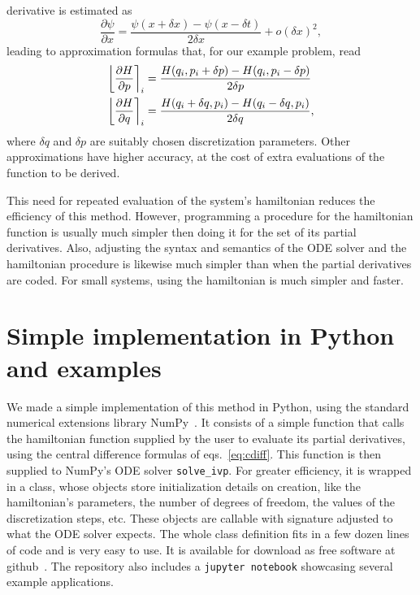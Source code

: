 \documentclass{iopart}
\newcommand{\numap}[1]{\ensuremath{%
    \left\lfloor#1\right\rceil
}}
\begin{document}
derivative is estimated as
\begin{equation}\label{eq:cdiff}
  \frac{\partial\psi}{\partial x} = 
    \frac{\psi(x+\delta x)-\psi(x-\delta t)}{2\delta x}+
  o(\delta x)^2,
\end{equation}
leading to approximation formulas that, for our example problem, read 
\begin{align}
  \numap{\frac{\partial H}{\partial p}}_i &=
  \frac{H(q_i, p_i+\delta p)-H(q_i, p_i-\delta p)}{2\delta p}\\
  \numap{\frac{\partial H}{\partial q}}_i &=
  \frac{H(q_i+\delta q, p_i)-H(q_i-\delta q, p_i)}{2\delta q},
\end{align}
where $\delta q$ and $\delta p$ are suitably chosen discretization parameters.
Other approximations have higher accuracy, at the cost of extra evaluations of
the function to be derived.

This need for repeated evaluation of the system's hamiltonian reduces the
efficiency of this method. However, programming a procedure for the hamiltonian
function is usually much simpler then doing it for the set of its partial
derivatives.  Also, adjusting the syntax and semantics of the ODE solver and the
hamiltonian procedure is likewise much simpler than when the partial derivatives
are coded.  For small systems, using the hamiltonian is much simpler and faster.



\section{Simple implementation in Python and examples}
We made a simple implementation of this method in Python, using the standard
numerical extensions library NumPy~\cite{numpy:2011,numpy:2020}.  It consists of
a simple function that calls the hamiltonian function supplied by the user to
evaluate its partial derivatives, using the central difference formulas of
eqs.~\eqref{eq:cdiff}. This function is then supplied to NumPy's ODE solver
\texttt{solve\_ivp}.  For greater efficiency, it is wrapped in a class, whose
objects store initialization details on creation, like the hamiltonian's
parameters, the number of degrees of freedom, the values of the discretization
steps, etc. These objects are callable with signature adjusted to what the ODE
solver expects.  The whole class definition fits in a few dozen lines of code
and is very easy to use. It is available for download as free software at
github~\cite{nevh:2020}. The repository also includes a \texttt{jupyter
notebook} showcasing several example applications.
\end{document}
